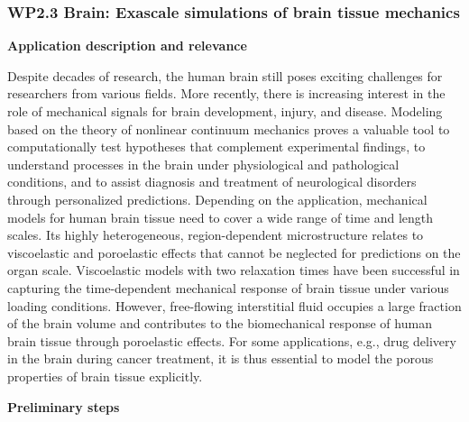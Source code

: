 \documentclass[a4paper,12pt, numbers]{article}
\begin{document}
\subsubsection*{WP2.3 Brain: Exascale simulations of brain tissue mechanics}

\noindent\textbf{Application description and relevance}

Despite decades of research, the human brain still poses exciting challenges for researchers from various fields.
More recently, there is increasing interest in the role of mechanical signals for brain development, injury, and disease.
Modeling based on the theory of nonlinear continuum mechanics proves a valuable tool to computationally test hypotheses that complement experimental findings, to understand processes in the brain under physiological and pathological conditions, and to assist diagnosis and treatment of neurological disorders through personalized predictions.
Depending on the application, mechanical models for human brain tissue need to cover a wide range of time and length scales.
Its highly heterogeneous, region-dependent microstructure relates to viscoelastic and poroelastic effects that cannot be neglected for predictions on the organ scale.
Viscoelastic models with two relaxation times have been successful in capturing the time-dependent mechanical response of brain tissue under various loading conditions.
However, free-flowing interstitial fluid occupies a large fraction of the brain volume and contributes to the biomechanical response of human brain tissue through poroelastic effects.
For some applications, e.g., drug delivery in the brain during cancer treatment, it is thus essential to model the porous properties of brain tissue explicitly.

\noindent\textbf{Preliminary steps}
\end{document}
